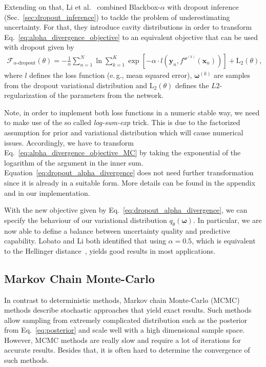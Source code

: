 \documentclass[runningheads]{llncs}
\begin{document}
Extending on that, Li et al.~\cite{li2017dropout} combined Blackbox-$\alpha$ with dropout inference (Sec.~\ref{sec:dropout_inference}) to tackle the problem of underestimating uncertainty.
For that, they introduce cavity distributions in order to transform Eq.~\ref{eq:alpha_divergence_objective} to an equivalent objective that can be used with dropout given by
\begin{align}
    \mathcal{F}_{\alpha\text{-dropout}}(\theta) = -\frac{1}{\alpha} \sum_{n=1}^N \ln \sum_{k=1}^{K}\exp\left[-\alpha \cdot l\left(\mathbf{y}_n, f^{\boldsymbol{\omega}^{(k)}} (\mathbf{x}_n)\right) \right] + \mathrm{L}_2(\theta), \label{eq:dropout_alpha_divergence}
\end{align}
where $l$ defines the loss function (e.\,g., mean squared error), $\boldsymbol{\omega}^{(k)}$ are samples from the dropout variational distribution and $\mathrm{L}_2(\theta)$ defines the $L2$-regularization of the parameters from the network.

Note, in order to implement both loss functions in a numeric stable way, we need to make use of the so called \textit{log-sum-exp} trick. %
This is due to the factorized assumption for prior and variational distribution which will cause numerical issues.
Accordingly, we have to transform  Eq.~\ref{eq:alpha_divergence_objective_MC} by taking the exponential of the logarithm of the argument in the inner sum.
Equation~\ref{eq:dropout_alpha_divergence} does not need further transformation since it is already in a suitable form.
More details can be found in the appendix and in our implementation.

With the new objective given by Eq.~\ref{eq:dropout_alpha_divergence}, we can specify the behaviour of our variational distribution $q_\theta(\boldsymbol{\omega})$. 
In particular, we are now able to define a balance between uncertainty quality and predictive capability.
Lobato and Li both identified that using $\alpha=0.5$, which is equivalent to the Hellinger distance~\cite{li2017dropout}, yields good results in most applications.


\subsection{Markov Chain Monte-Carlo}
\label{sec:mcmc}
In contrast to deterministic methods, Markov chain Monte-Carlo (MCMC) methods describe stochastic approaches that yield exact results.
Such methods allow sampling from extremely complicated distribution such as the posterior from Eq.~\ref{eq:posterior} and scale well with a high dimensional sample space.
However, MCMC methods are really slow and require a lot of iterations for accurate results.
Besides that, it is often hard to determine the convergence of such methods.
\end{document}
